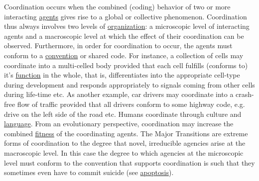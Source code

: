 \documentclass[12pt]{article}
\begin{document}
Coordination occurs when the combined (coding) behavior of two or
more interacting \hyperlink{agent}{agents} gives rise to a global or
collective phenomenon. Coordination thus always involves two levels of
\hyperlink{organization}{organization}: a microscopic level of
interacting agents and a macroscopic level at which the effect of
their coordination can be observed. Furthermore, in order for
coordination to occur, the agents must conform to a
\hyperlink{convention}{convention} or shared code. For instance, a
collection of cells may coordinate into a multi-celled body provided
that each cell fulfills (conforms to) it's
\hyperlink{function}{function} in the whole, that is, differentiates
into the appropriate cell-type during development and responds
appropriately to signals coming from other cells during life-time
etc. As another example, car drivers may coordinate into a crash-free
flow of traffic provided that all drivers conform to some highway
code, e.g. drive on the left side of the road etc. Humans coordinate
through culture and \hyperlink{language}{language}. From an
evolutionary perspective, coordination may increase the combined
\hyperlink{fitness}{fitness} of the coordinating agents. The Major
Transitions are extreme forms of coordination to the degree that
novel, irreducible agencies arise at the macroscopic level. In this
case the degree to which agencies at the microscopic level must
conform to the convention that supports coordination is such that they
sometimes even have to commit suicide (see \hyperlink{apoptosis}{apoptosis}).

\hypertarget{copying_and_coding}{}
\end{document}
